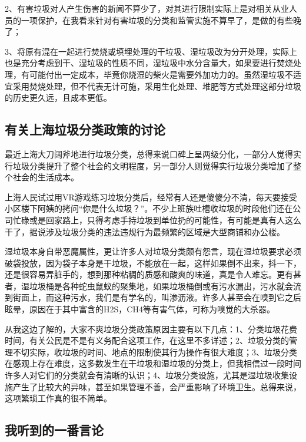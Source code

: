 \documentclass[]{book}
\begin{document}
2、有害垃圾对人产生伤害的新闻不算少了，对其进行限制实际上是对相关从业人员的一项保护，在我看来针对有害垃圾的分类和监管实施不算早了，是做的有些晚了；

3、将原有混在一起进行焚烧或填埋处理的干垃圾、湿垃圾改为分开处理，实际上也是充分考虑到干、湿垃圾的性质不同，湿垃圾中水分含量大，如果要进行焚烧处理，有可能付出一定成本，毕竟你烧湿的柴火是需要外加功力的。虽然湿垃圾不适宜采用焚烧处理，但不代表无计可施，采用生化处理、堆肥等方式处理这部分垃圾的历史更久远，且成本更低。

\hypertarget{ux6709ux5173ux4e0aux6d77ux5783ux573eux5206ux7c7bux653fux7b56ux7684ux8ba8ux8bba}{%
\subsection{有关上海垃圾分类政策的讨论}\label{ux6709ux5173ux4e0aux6d77ux5783ux573eux5206ux7c7bux653fux7b56ux7684ux8ba8ux8bba}}

最近上海大刀阔斧地进行垃圾分类，总得来说口碑上呈两级分化，一部分人觉得实行垃圾分类提升了整个社会的文明程度，另一部分人则觉得实行垃圾分类增加了整个社会的生活成本。

上海人民试过用VR游戏练习垃圾分类后，经常有人还是傻傻分不清，每天要接受小区楼下阿姨的拷问``你是什么垃圾？''。不少上班族吐槽收垃圾的时段他们还在公司忙碌或是回家路上，只得考虑手持垃圾到单位扔的可能性，有可能是真有人这么干了，据说涉及垃圾分类的违法违规行为最频繁的区域是大型商铺和办公楼。

湿垃圾本身自带恶魔属性，更让许多人对垃圾分类颇有怨言，现在湿垃圾要求必须破袋投放，因为袋子本身是干垃圾，不能放在一起，这样如果倒不出来，抖一下，还是很容易弄脏手的，想到那种粘稠的质感和酸爽的味道，真是令人难忘。更有甚者，湿垃圾桶是各种蛇虫鼠蚁的聚集地，如果垃圾桶倒或有污水漏出，污水就会流到街面上，而这种污水，我们是有学名的，叫渗沥液。许多人甚至会在嗅到它之后眩晕，原因在于其中富含的H2S，CH4等有害气体，可称为嗅觉的大杀器。

从我这边了解的，大家不爽垃圾分类政策原因主要有以下几点：1、分类垃圾花费时间，有关公民是不是有义务配合这项工作，在这里不多详述；2、垃圾分类的管理不切实际，收垃圾的时间、地点的限制使其行为操作有很大难度；3、垃圾分类在感观上存在难度，这多数发生在干垃圾和湿垃圾的分类上，但我相信过一段时间许多人对它们的分类就会有清晰的认识；4、垃圾分类设施，尤其是湿垃圾收集设施产生了比较大的异味，甚至如果管理不善，会严重影响了环境卫生。总得来说，这项繁琐工作真的很不简单。

\hypertarget{ux6211ux542cux5230ux7684ux4e00ux756aux8a00ux8bba}{%
\subsection{我听到的一番言论}\label{ux6211ux542cux5230ux7684ux4e00ux756aux8a00ux8bba}}
\end{document}
